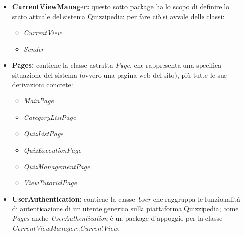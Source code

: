 \documentclass[a4paper,11pt]{article}
\begin{document}
	\begin{itemize}
		\item\textbf{CurrentViewManager:} questo sotto package ha lo scopo di definire lo stato attuale del sistema Quizzipedia; per fare ciò si avvale delle classi:
			\begin{itemize}
				\item\textit{CurrentView}%
				\item\textit{Sender}%
			\end{itemize}
		\item\textbf{Pages:} contiene la classe astratta \textit{Page}, che rappresenta una specifica situazione del sistema (ovvero una pagina web del sito), più tutte le sue derivazioni concrete:
			\begin{itemize}
				\item\textit{MainPage}%
				\item\textit{CategoryListPage}%
				\item\textit{QuizListPage}%
				\item\textit{QuizExecutionPage}%
				\item\textit{QuizManagementPage}%
				\item\textit{ViewTutorialPage}%
			\end{itemize}
		\item\textbf{UserAuthentication:} contiene la classe \textit{User} che raggruppa le funzionalità di autenticazione di un utente generico sulla piattaforma Quizzipedia; come \textit{Pages} anche \textit{UserAuthentication} è un package d'appoggio per la classe \textit{CurrentViewManager}::\textit{CurrentView}.\\
		\\
	\end{itemize}
\end{document}
